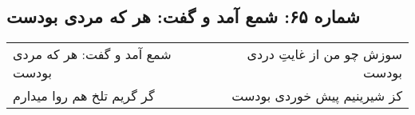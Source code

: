 \begin{center}
\section*{شماره ۶۵: شمع آمد و گفت: هر که مردی بودست}
\label{sec:065}
\begin{longtable}{l p{0.5cm} r}
شمع آمد و گفت: هر که مردی بودست
&&
سوزش چو من از غایتِ دردی بودست
\\
گر گریم تلخ هم روا میدارم
&&
کز شیرینیم پیش خوردی بودست
\\
\end{longtable}
\end{center}
